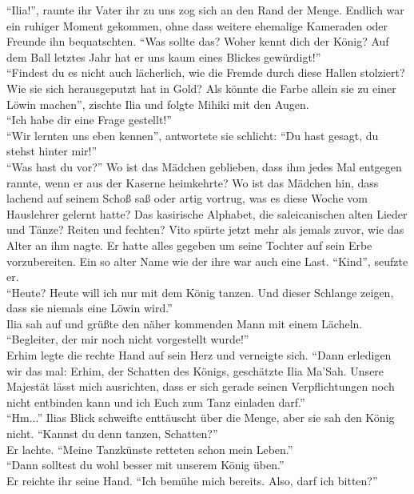 ``Ilia!'', raunte ihr Vater ihr zu uns zog sich an den Rand der Menge. Endlich war ein ruhiger 
Moment gekommen, ohne dass weitere ehemalige Kameraden oder Freunde ihn bequatschten. ``Was sollte 
das? Woher kennt dich der König? Auf dem Ball letztes Jahr hat er uns kaum eines Blickes 
gewürdigt!''\\
``Findest du es nicht auch lächerlich, wie die Fremde durch diese Hallen stolziert? Wie sie sich 
herausgeputzt hat in Gold? Als könnte die Farbe allein sie zu einer Löwin machen'', zischte Ilia 
und folgte Mihiki mit den Augen.\\
``Ich habe dir eine Frage gestellt!''\\
``Wir lernten uns eben kennen'', antwortete sie schlicht: ``Du hast gesagt, du stehst hinter 
mir!''\\
``Was hast du vor?'' Wo ist das Mädchen geblieben, dass ihm jedes Mal entgegen rannte, wenn er aus 
der Kaserne heimkehrte? Wo ist das Mädchen hin, dass lachend auf seinem Schoß saß oder artig 
vortrug, was es diese Woche vom Hauslehrer gelernt hatte? Das kasirische Alphabet, die 
saleicanischen alten Lieder und Tänze? Reiten und fechten? Vito spürte jetzt mehr als jemals 
zuvor, wie das Alter an ihm nagte. Er hatte alles gegeben um seine Tochter auf sein Erbe 
vorzubereiten. Ein so alter Name wie der ihre war auch eine Last. ``Kind'', seufzte er.\\
``Heute? Heute will ich nur mit dem König tanzen. Und dieser Schlange zeigen, dass sie niemals eine 
Löwin wird.''\\
Ilia sah auf und grüßte den näher kommenden Mann mit einem Lächeln. ``Begleiter, der mir noch nicht 
vorgestellt wurde!''\\
Erhim legte die rechte Hand auf sein Herz und verneigte sich. ``Dann erledigen wir das 
mal: Erhim, der Schatten des Königs, geschätzte Ilia Ma'Sah. Unsere Majestät lässt mich ausrichten, 
dass er sich gerade seinen Verpflichtungen noch nicht entbinden kann und ich Euch zum Tanz einladen 
darf.''\\
``Hm...'' Ilias Blick schweifte enttäuscht über die Menge, aber sie sah den König nicht. ``Kannst 
du denn tanzen, Schatten?''\\
Er lachte. ``Meine Tanzkünste retteten schon mein Leben.''\\
``Dann solltest du wohl besser mit unserem König üben.''\\
Er reichte ihr seine Hand. ``Ich bemühe mich bereits. Also, darf ich bitten?''\\

